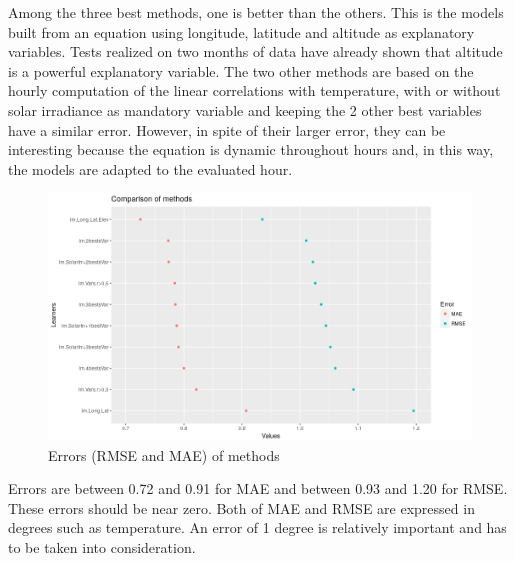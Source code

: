 \documentclass[12pt,twoside]{reedthesis}
\theoremstyle{definition}
\theoremstyle{definition}
\theoremstyle{definition}
\theoremstyle{remark}
\begin{document}
Among the three best methods, one is better than the others. This is the
models built from an equation using longitude, latitude and altitude as
explanatory variables. Tests realized on two months of data have already
shown that altitude is a powerful explanatory variable. The two other
methods are based on the hourly computation of the linear correlations
with temperature, with or without solar irradiance as mandatory variable
and keeping the 2 other best variables have a similar error. However, in
spite of their larger error, they can be interesting because the
equation is dynamic throughout hours and, in this way, the models are
adapted to the evaluated hour.
\begin{figure}

{\centering \includegraphics[width=1\linewidth]{figure/meanerror} 

}

\caption{Errors (RMSE and MAE) of methods}\label{fig:meanerror}
\end{figure}
Errors are between 0.72 and 0.91 for MAE and between 0.93 and 1.20 for
RMSE. These errors should be near zero. Both of MAE and RMSE are
expressed in degrees such as temperature. An error of 1 degree is
relatively important and has to be taken into consideration.

~
\end{document}
